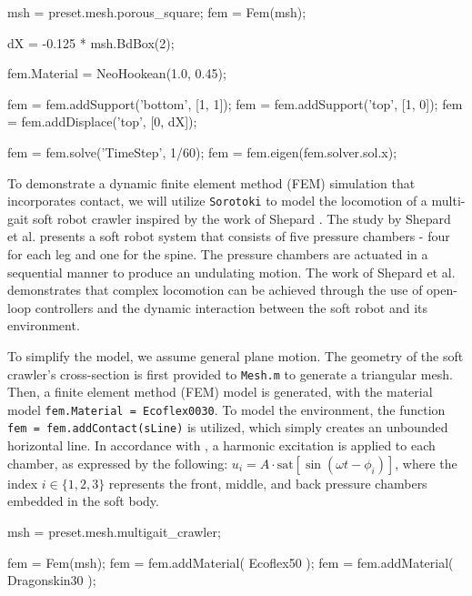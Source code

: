 \begin{matlabcode}
msh = preset.mesh.porous_square;
fem = Fem(msh);

dX  = -0.125 * msh.BdBox(2);

fem.Material = NeoHookean(1.0, 0.45);

fem = fem.addSupport('bottom', [1, 1]);
fem = fem.addSupport('top', [1, 0]);
fem = fem.addDisplace('top', [0, dX]);

fem = fem.solve('TimeStep', 1/60);
fem = fem.eigen(fem.solver.sol.x);
\end{matlabcode}
    
\begin{example}
To demonstrate a dynamic finite element method (FEM) simulation that incorporates contact, we will utilize \texttt{Sorotoki} to model the locomotion of a multi-gait soft robot crawler inspired by the work of Shepard \cite{Shepherd2011Dec}. The study by Shepard  et al. \cite{Shepherd2011Dec} presents a soft robot system that consists of five pressure chambers - four for each leg and one for the spine. The pressure chambers are actuated in a sequential manner to produce an undulating motion. The work of Shepard  et al. \cite{Shepherd2011Dec} demonstrates that complex locomotion can be achieved through the use of open-loop controllers and the dynamic interaction between the soft robot and its environment.

To simplify the model, we assume general plane motion. The geometry of the soft crawler's cross-section is first provided to \texttt{Mesh.m} to generate a triangular mesh. Then, a finite element method (FEM) model is generated, with the material model \texttt{fem.Material = Ecoflex0030}. To model the environment, the function \texttt{fem = fem.addContact(sLine)} is utilized, which simply creates an unbounded horizontal line. In accordance with \cite{Shepherd2011Dec}, a harmonic excitation is applied to each chamber, as expressed by the following: $u_i = A\cdot\textrm{sat}\left[\sin(\omega t - \phi_i) \right]$, where the index $i \in \{1,2,3\}$ represents the front, middle, and back pressure chambers embedded in the soft body. 

\begin{matlabcode} 
msh = preset.mesh.multigait_crawler;

fem = Fem(msh);
fem = fem.addMaterial( Ecoflex50 );
fem = fem.addMaterial( Dragonskin30 );


\end{matlabcode}
\end{example}
